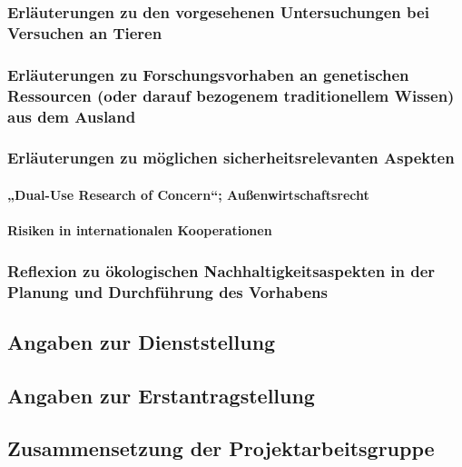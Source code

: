 \documentclass[de]{dfg-proposal}
\begin{document}

\subsubsection{Erläuterungen zu den vorgesehenen Untersuchungen bei Versuchen an Tieren}

\subsubsection{Erläuterungen zu Forschungsvorhaben an genetischen Ressourcen (oder darauf bezogenem traditionellem Wissen) aus dem Ausland}

\subsubsection{Erläuterungen zu möglichen sicherheitsrelevanten Aspekten}

\paragraph{„Dual-Use Research of Concern“; Außenwirtschaftsrecht}

\paragraph{Risiken in internationalen Kooperationen}

\subsubsection{Reflexion zu ökologischen Nachhaltigkeitsaspekten in der Planung und Durchführung des Vorhabens}

\subsection{Angaben zur Dienststellung}

\subsection{Angaben zur Erstantragstellung}

\subsection{Zusammensetzung der Projektarbeitsgruppe}
\end{document}
